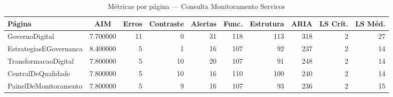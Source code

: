 \begin{table}[htbp]
  \centering
  \caption{Métricas por página — Consulta Monitoramento Servicos}
  \label{tab:flow_consulta_monitoramento_servicos}
  \small
  \begin{tabular}{lcrrrrrrrr}
\toprule
Página & AIM & Erros & Contraste & Alertas & Func. & Estrutura & ARIA & LS Crít. & LS Méd. \\
\midrule
GovernoDigital & 7.700000 & 11 & 0 & 31 & 118 & 113 & 318 & 2 & 27 \\
EstrategiasEGovernanca & 8.400000 & 5 & 1 & 16 & 107 & 92 & 237 & 2 & 14 \\
TransformacaoDigital & 7.800000 & 5 & 10 & 20 & 107 & 91 & 248 & 2 & 14 \\
CentralDeQualidade & 7.800000 & 5 & 10 & 16 & 110 & 100 & 240 & 2 & 14 \\
PainelDeMonitoramento & 7.800000 & 5 & 9 & 16 & 107 & 93 & 236 & 2 & 15 \\
\bottomrule
\end{tabular}
\end{table}
